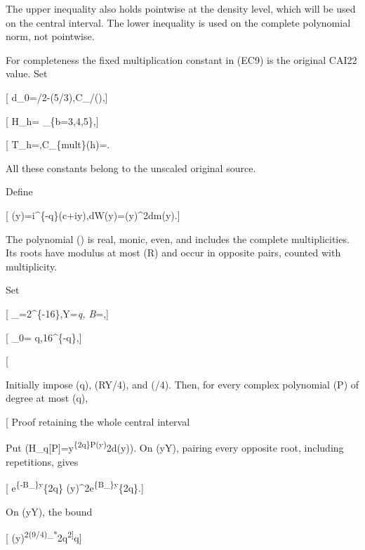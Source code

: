 The upper inequality also holds pointwise at the density level, which will be used on the central interval. The lower inequality is used on the complete polynomial norm, not pointwise.

For completeness the fixed multiplication constant in (EC9) is the original CAI22 value. Set

{[} d\_0=\pi/2-\log(5/3),\quad C\_/(\sqrt{2\pi}),{]}

{[} H\_h= \max\_\{b=3,4,5\},{]}

{[} T\_h=,\qquad C\_\{\rm mult\}(h)=. \tag{EC16}{]}

All these constants belong to the unscaled original source.

Define

{[} \widehat\chi(y)=i\^{}\{-q\}\chi(c+iy),\quad dW(y)=\widehat\chi(y)\^{}2dm(y).{]}

The polynomial (\widehat\chi) is real, monic, even, and includes the complete multiplicities. Its roots have modulus at most (R) and occur in opposite pairs, counted with multiplicity.

Set

{[} \epsilon\_=2\^{}\{-16\},\quad Y=\epsilon\emph{q, \quad B}\chi=,{]}

{[} \eta\_0=  q,16\^{}\{-q\},{]}

{[}  \tag{EC17}{]}

Initially impose (q), (R\le Y/4), and (\eta{}/4). Then, for every complex polynomial (P) of degree at most (q),

{[}  \tag{EC18}{]} Proof retaining the whole central interval

Put (\mathcal H\_q{[}P{]}=\int\textbar y\textbar{}\textsuperscript{\{2q\}\textbar P(y)\textbar{}}2d\sigma(y)). On (\textbar y\textbar{}\ge Y), pairing every opposite root, including repetitions, gives

{[} e\textsuperscript{\{-B\_\chi\}\textbar y\textbar{}}\{2q\} \le\widehat\chi(y)\^{}2\le e\textsuperscript{\{B\_\chi\}\textbar y\textbar{}}\{2q\}.{]}

On (\textbar y\textbar{}\le Y), the bound

{[} \widehat\chi(y)\textsuperscript{2\le{[}(9/4)\epsilon\_*}2q\textsuperscript{2{]}}q{]}

